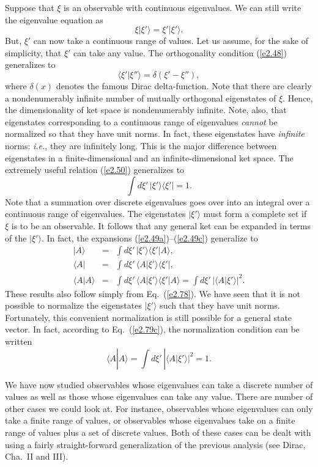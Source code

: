 Suppose that $\xi$ is an observable with continuous eigenvalues. We can still
write the eigenvalue equation as
\begin{equation}
\xi |\xi'\rangle =\xi' |\xi'\rangle.
\end{equation}
But, $\xi'$ can now take a continuous range of values. Let us assume, for
the sake of simplicity, that $\xi'$ can take any value. The orthogonality
condition (\ref{e2.48}) generalizes to
\begin{equation}\label{e2.77}
\langle \xi'|\xi''\rangle = \delta(\xi'-\xi''),
\end{equation}
where $\delta(x)$ denotes the famous Dirac delta-function. Note that there are
clearly a nondenumerably infinite number of mutually orthogonal eigenstates of $\xi$.
Hence, the dimensionality of ket space is nondenumerably infinite. Note, also,
that eigenstates corresponding to a continuous range of eigenvalues {\em cannot}
be normalized so that they have unit norms. In fact, these eigenstates have
{\em infinite} norms: {\em i.e.}, they are infinitely long. This is the major difference
between eigenstates in a finite-dimensional and an infinite-dimensional ket space. 
The extremely useful relation (\ref{e2.50}) generalizes to
\begin{equation}\label{e2.78}
\int d\xi' \,|\xi'\rangle\langle \xi'| = 1.
\end{equation}
Note that a summation over discrete eigenvalues goes over into an integral over
a continuous range of eigenvalues. The eigenstates $|\xi'\rangle$ must form
a complete set if $\xi$ is to be an observable. It follows that any general
ket can be expanded in terms of the $|\xi'\rangle$. In fact, the expansions
(\ref{e2.49a})--(\ref{e2.49c}) generalize to
\begin{eqnarray}
|A\rangle &=& \int d\xi'\,|\xi'\rangle\langle \xi'| A\rangle,\\[0.5ex]
\langle A| &=& \int d\xi'\,\langle A|\xi'\rangle \langle \xi'|,\\[0.5ex]
\langle A|A\rangle &=& \int d\xi'\,\langle A|\xi'\rangle\langle
\xi'|A\rangle = \int d\xi' \,|\langle A|\xi'\rangle|^2.\label{e2.79c}
\end{eqnarray}
These results also follow simply from Eq.~(\ref{e2.78}). We have seen that it is not
possible to normalize the eigenstates $|\xi'\rangle$ such that they have unit norms.
Fortunately, this convenient  normalization is still
 possible for a general state vector.
In fact, according to Eq.~(\ref{e2.79c}), the normalization condition can be written
\begin{equation}
\langle A|A\rangle =\int d\xi' \,|\langle A|\xi'\rangle|^2 = 1.
\end{equation}

We have now studied observables whose eigenvalues can take a discrete number of
values as well as those whose eigenvalues can take any value. There are 
number of other cases
we could look at. For instance, observables whose eigenvalues can only take
a finite range of values, or observables whose eigenvalues take on a
finite range of values plus a set of discrete values. Both of these cases can be 
dealt with  using a fairly straight-forward generalization of the previous
analysis (see Dirac, Cha.\ II and III).

